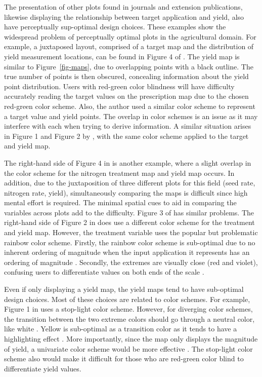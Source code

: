 \documentclass[
  authoryear,
  preprint,
  3p]{elsarticle}
\begin{document}
The presentation of other plots found in journals and extension
publications, likewise displaying the relationship between target
application and yield, also have perceptually sup-optimal design
choices. These examples show the widespread problem of perceptually
optimal plots in the agricultural domain. For example, a juxtaposed
layout, comprised of a target map and the distribution of yield
measurement locations, can be found in Figure 4 of
\citet{Peerlinck2018UsingDL}. The yield map is similar to
Figure~\ref{fig-maps}, due to overlapping points with a black outline.
The true number of points is then obscured, concealing information about
the yield point distribution. Users with red-green color blindness will
have difficulty accurately reading the target values on the prescription
map due to the chosen red-green color scheme. Also, the author used a
similar color scheme to represent a target value and yield points. The
overlap in color schemes is an issue as it may interfere with each when
trying to derive information. A similar situation arises in Figure 1 and
Figure 2 by \citet{poursina-nitrogen-2021}, with the same color scheme
applied to the target and yield map.

The right-hand side of Figure 4 in \citet{gardner-ag-2021} is another
example, where a slight overlap in the color scheme for the nitrogen
treatment map and yield map occurs. In addition, due to the
juxtaposition of three different plots for this field (seed rate,
nitrogen rate, yield), simultaneously comparing the maps is difficult
since high mental effort is required. The minimal spatial cues to aid in
comparing the variables across plots add to the difficulty. Figure 3 of
\citet{trevisan-spatial-2021} has similar problems. The right-hand side
of Figure 2 in \citet{maxwell-farm-2018} does use a different color
scheme for the treatment and yield map. However, the treatment variable
uses the popular but problematic rainbow color scheme. Firstly, the
rainbow color scheme is sub-optimal due to no inherent ordering of
magnitude when the input application it represents has an ordering of
magnitude \citep{light-rainbow-2004}. Secondly, the extremes are
visually close (red and violet), confusing users to differentiate values
on both ends of the scale \citep{SILVA2011320}.

Even if only displaying a yield map, the yield maps tend to have
sub-optimal design choices. Most of these choices are related to color
schemes. For example, Figure 1 in \citet{tao_ag_2019} uses a stop-light
color scheme. However, for diverging color schemes, the transition
between the two extreme colors should go through a neutral color, like
white \citep{MIDWAY2020100141}. Yellow is sub-optimal as a transition
color as it tends to have a highlighting effect \citep{SILVA2011320}.
More importantly, since the map only displays the magnitude of yield, a
univariate color scheme would be more effective \citep{vanderplas2020}.
The stop-light color scheme also would make it difficult for those who
are red-green color blind to differentiate yield values.
\end{document}
